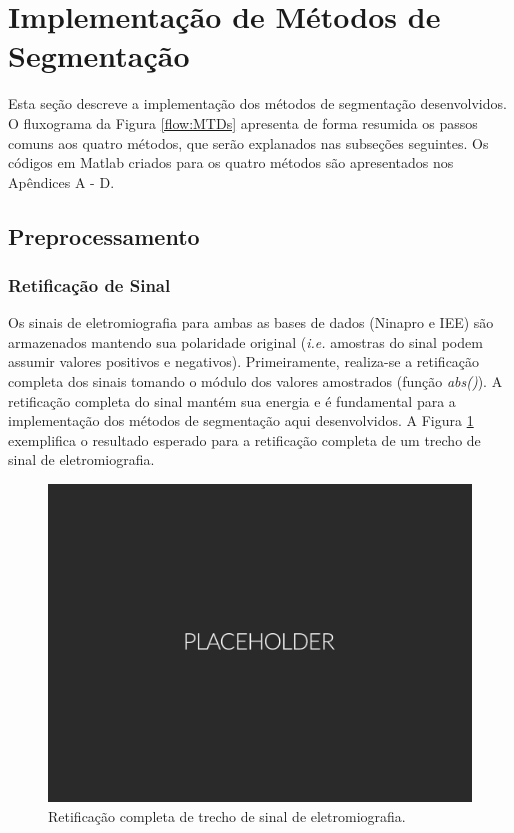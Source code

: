 \section{Implementação de Métodos de Segmentação}

Esta seção descreve a implementação dos métodos de segmentação desenvolvidos. O fluxograma da Figura \ref{flow:MTDs} apresenta de forma resumida os passos comuns aos quatro métodos, que serão explanados nas subseções seguintes. Os códigos em Matlab criados para os quatro métodos são apresentados nos Apêndices A - D.




\subsection {Preprocessamento}
\subsubsection{Retificação de Sinal}

Os sinais de eletromiografia para ambas as bases de dados (Ninapro e IEE) são armazenados mantendo sua polaridade original (\emph{i.e.} amostras do sinal podem assumir valores positivos e negativos). Primeiramente, realiza-se a retificação completa dos sinais tomando o módulo dos valores amostrados (função \emph{abs()}). A retificação completa do sinal mantém sua energia e é fundamental para a implementação dos métodos de segmentação aqui desenvolvidos. A Figura \ref{fig:rectification} exemplifica o resultado esperado para a retificação completa de um trecho de sinal de eletromiografia.

\begin{figure}[htb]
	\caption{\label{fig:rectification} Retificação completa de trecho de sinal de eletromiografia.}
	\begin{center}
	    \includegraphics[width=0.75\linewidth]{./img/placeholder.png}
	\end{center}
\end{figure}

